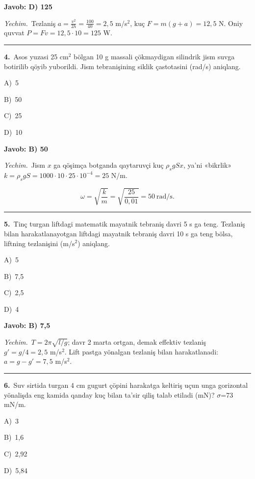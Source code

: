 \documentclass[11pt,a4paper]{article}
\newcommand{\opt}[2]{\hspace*{4mm}#1)\ #2\par}
\begin{document}
\noindent\colorbox{gray!12}{\parbox{\dimexpr\linewidth-2\fboxsep}{\textbf{Javob: D) 125}}}\par\smallskip
\noindent\textit{Yechim.}\ Tezlaniş $a=\frac{v^2}{2h}=\frac{100}{40}=2{,}5$ m/s$^2$, kuç $F=m(g+a)=12{,}5$ N. Oniy quvvat $P=Fv=12{,}5\cdot10=125$ W.\par\par\medskip\hrule\medskip
{}\noindent\begin{minipage}{\linewidth}
\textbf{4.}\ Asos yuzasi 25 cm$^{2}$ bölgan 10 g massali çökmaydigan silindrik jism suvga botirilib qöyib yuborildi. Jism tebranişining siklik çastotasini (rad/s) aniqlang.\par\smallskip
\opt{A}{5}
\opt{B}{50}
\opt{C}{25}
\opt{D}{10}
\end{minipage}\vspace{2pt}\par
\noindent\colorbox{gray!12}{\parbox{\dimexpr\linewidth-2\fboxsep}{\textbf{Javob: B) 50}}}\par\smallskip
\noindent\textit{Yechim.}\ Jism $x$ ga qöşimça botganda qaytaruvçi kuç $\rho_s gSx$, ya’ni «bikrlik» $k=\rho_s gS=1000\cdot10\cdot25\cdot10^{-4}=25$ N/m.\par
\[\omega=\sqrt{\frac{k}{m}}=\sqrt{\frac{25}{0{,}01}}=50\ \text{rad/s}.\]\par\medskip\hrule\medskip
{}\noindent\begin{minipage}{\linewidth}
\textbf{5.}\ Tinç turgan liftdagi matematik mayatnik tebraniş davri 5 s ga teng. Tezlaniş bilan harakatlanayotgan liftdagi mayatnik tebraniş davri 10 s ga teng bölsa, liftning tezlanişini (m/s$^{2}$) aniqlang.\par\smallskip
\opt{A}{5}
\opt{B}{7,5}
\opt{C}{2,5}
\opt{D}{4}
\end{minipage}\vspace{2pt}\par
\noindent\colorbox{gray!12}{\parbox{\dimexpr\linewidth-2\fboxsep}{\textbf{Javob: B) 7,5}}}\par\smallskip
\noindent\textit{Yechim.}\ $T=2\pi\sqrt{l/g}$; davr 2 marta ortgan, demak effektiv tezlaniş $g'=g/4=2{,}5$ m/s$^2$. Lift pastga yönalgan tezlaniş bilan harakatlanadi: $a=g-g'=7{,}5$ m/s$^2$.\par\par\medskip\hrule\medskip
{}\noindent\begin{minipage}{\linewidth}
\textbf{6.}\ Suv sirtida turgan 4 cm gugurt çöpini harakatga keltiriş uçun unga gorizontal yönalişda eng kamida qanday kuç bilan ta’sir qiliş talab etiladi (mN)? $\sigma$=73 mN/m.\par\smallskip
\opt{A}{3}
\opt{B}{1,6}
\opt{C}{2,92}
\opt{D}{5,84}
\end{minipage}\vspace{2pt}\par
\end{document}
